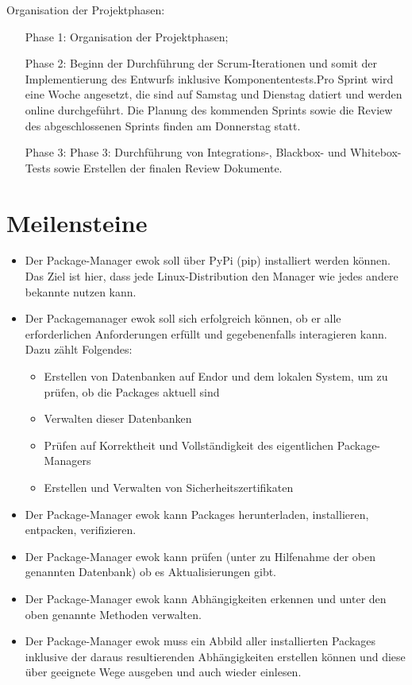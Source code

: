 Organisation der Projektphasen:
\begin{itemize}
	\item[Phase 1:] Organisation der Projektphasen;
	\item[Phase 2:] Beginn der Durchführung der Scrum-Iterationen und somit der Implementierung des Entwurfs inklusive Komponententests.Pro Sprint wird eine Woche angesetzt, die  sind auf Samstag und Dienstag datiert und werden online durchgeführt. Die Planung des kommenden Sprints sowie die Review des abgeschlossenen Sprints finden am Donnerstag statt.
	\item[Phase 3:] 	Phase 3: Durchführung von Integrations-, Blackbox- und Whitebox- Tests sowie Erstellen der finalen Review Dokumente.
	
	
\end{itemize}
\clearpage
\section{Meilensteine}

\begin{itemize}
	\item 
		Der Package-Manager ewok soll über PyPi (pip) installiert werden können. Das Ziel ist hier, dass jede Linux-Distribution den Manager wie jedes andere bekannte  nutzen kann.
	
	\item Der Packagemanager ewok soll sich erfolgreich  können, ob er alle erforderlichen Anforderungen erfüllt und gegebenenfalls interagieren kann. Dazu zählt Folgendes:
		
		\begin{itemize}	
			\item Erstellen von Datenbanken auf Endor und dem lokalen System, um zu prüfen, ob die Packages aktuell sind
			\item Verwalten dieser Datenbanken
			\item Prüfen auf Korrektheit und Vollständigkeit des eigentlichen Package-Managers
			\item Erstellen und Verwalten von Sicherheitszertifikaten
		\end{itemize}
	\item Der Package-Manager ewok kann Packages herunterladen, installieren, entpacken, verifizieren.
	\item Der Package-Manager ewok kann prüfen (unter zu Hilfenahme der oben genannten Datenbank) ob es Aktualisierungen gibt.
	\item Der Package-Manager ewok kann Abhängigkeiten erkennen und unter den oben genannte Methoden verwalten.
	\item Der Package-Manager ewok muss ein Abbild aller installierten Packages inklusive der daraus resultierenden Abhängigkeiten erstellen können und diese über geeignete Wege ausgeben und auch wieder einlesen.
\end{itemize}